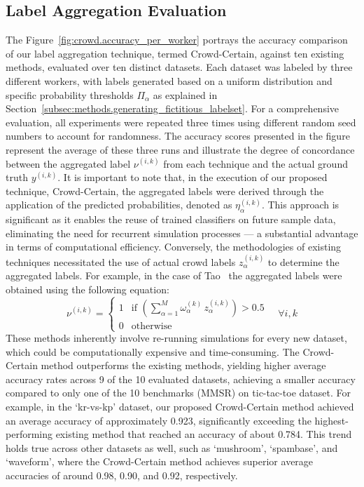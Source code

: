 \documentclass[sn-nature]{bst/sn-jnl}
\begin{document}
\subsection{Label Aggregation Evaluation}
The Figure~\ref{fig:crowd.accuracy_per_worker} portrays the accuracy comparison of our label aggregation technique, termed Crowd-Certain, against ten existing methods, evaluated over ten distinct datasets. Each dataset was labeled by three different workers, with labels generated based on a uniform distribution and specific probability thresholds $\Pi_\alpha$ as explained in Section~\ref{subsec:methods.generating_fictitious_labelset}.
For a comprehensive evaluation, all experiments were repeated three times using different random seed numbers to account for randomness. The accuracy scores presented in the figure represent the average of these three runs and illustrate the degree of concordance between the aggregated label $\nu^{(i,k)}$ from each technique and the actual ground truth $y^{(i,k)}$.
It is important to note that, in the execution of our proposed technique, Crowd-Certain, the aggregated labels were derived through the application of the predicted probabilities, denoted as $\eta_{\alpha}^{(i,k)}$. This approach is significant as it enables the reuse of trained classifiers on future sample data, eliminating the need for recurrent simulation processes --- a substantial advantage in terms of computational efficiency. Conversely, the methodologies of existing techniques necessitated the use of actual crowd labels $z_\alpha^{(i,k)}$ to determine the aggregated labels. For example, in the case of Tao~\cite{tao_Label_2020} the aggregated labels were obtained using the following equation:
\begin{equation}
    \nu^{(i,k)} =
    \begin{cases}
        1 & \text{if } \left(\sum_{\alpha=1}^{M} \omega_{\alpha}^{(k)}\, z_{\alpha}^{(i,k)}\right) > 0.5 \\
        0 & \text{otherwise}
    \end{cases}
    \quad \forall i, k
    \label{eq:crowd.aggregated_label_benchmarks}
\end{equation}
These methods inherently involve re-running simulations for every new dataset, which could be computationally expensive and time-consuming. The Crowd-Certain method outperforms the existing methods, yielding higher average accuracy rates across 9 of the 10 evaluated datasets, achieving a smaller accuracy compared to only one of the 10 benchmarks (MMSR) on tic-tac-toe dataset. For example, in the `kr-vs-kp' dataset, our proposed Crowd-Certain method achieved an average accuracy of approximately 0.923, significantly exceeding the highest-performing existing method that reached an accuracy of about 0.784. This trend holds true across other datasets as well, such as `mushroom', `spambase', and `waveform', where the Crowd-Certain method achieves superior average accuracies of around 0.98, 0.90, and 0.92, respectively.
\end{document}
